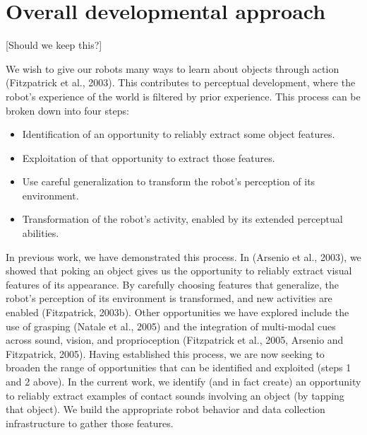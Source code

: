 \section{Overall developmental approach}
 \label{sec:approach}
[Should we keep this?]

 We wish to give our robots many ways to learn about
objects through action (Fitzpatrick et al., 2003). This
contributes to perceptual development, where the robot's
experience of the world is filtered by prior experience. This
process can be broken down into four steps:

\begin{itemize}

\item Identification of an opportunity to reliably extract some
object features.

\item Exploitation of that opportunity to extract those features.

\item Use careful generalization to transform the robot's
perception of its environment.

\item Transformation of the robot's activity, enabled by its
extended perceptual abilities.

\end{itemize}

In previous work, we have demonstrated this process. In (Arsenio
et al., 2003), we showed that poking an object gives us the
opportunity to reliably extract visual features of its appearance.
By carefully choosing features that generalize, the robot's
perception of its environment is transformed, and new activities
are enabled (Fitzpatrick, 2003b). Other opportunities we have
explored include the use of grasping (Natale et al., 2005) and the
integration of multi-modal cues across sound, vision, and
proprioception (Fitzpatrick et al., 2005, Arsenio and Fitzpatrick,
2005). Having established this process, we are now seeking to
broaden the range of opportunities that can be identified and
exploited (steps 1 and 2 above). In the current work, we identify
(and in fact create) an opportunity to reliably extract examples
of contact sounds involving an object (by tapping that object). We
build the appropriate robot behavior and data collection
infrastructure to gather those features.
